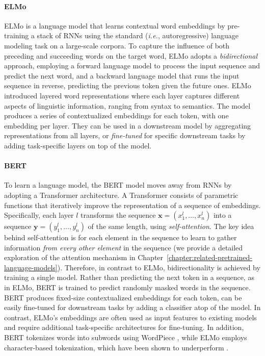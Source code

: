 \paragraph{ELMo} \ac{ELMo} \citep{peters-etal-2018-deep} is a language model that learns contextual word embeddings by pre-training a stack of \acp{RNN} using the standard (\textit{i.e.}, autoregressive) language modeling task on a large-scale corpora. To capture the influence of both preceding and succeeding words on the target word, \ac{ELMo} adopts a \textit{bidirectional} approach, employing a forward language model to process the input sequence and predict the next word, and a backward language model that runs the input sequence in reverse, predicting the previous token given the future ones. \ac{ELMo} introduced layered word representations where each layer captures different aspects of linguistic information, ranging from syntax to semantics. The model produces a series of contextualized embeddings for each token, with one embedding per layer. They can be used in a downstream model by aggregating representations from all layers, or \textit{fine-tuned} for specific downstream tasks by adding task-specific layers on top of the model.

\paragraph{BERT} To learn a language model, the \ac{BERT} model \citep{devlin2018bert} moves away from \acp{RNN} by adopting a Transformer \citep{vaswani2017attention} architecture. A Transformer consists of parametric functions that iteratively improve the representation of a sequence of embeddings. Specifically, each layer $l$ transforms the sequence $\bm{x} = (x^l_1, \ldots, x^l_n)$ into a sequence $\bm{y} = (y^l_1, \ldots, y^l_n)$ of the same length, using \textit{self-attention}. The key idea behind self-attention is for each element in the sequence to learn to gather information \textit{from every other element} in the sequence (we provide a detailed exploration of the attention mechanism in Chapter~\ref{chapter:related-pretrained-language-models}). Therefore, in contrast to \ac{ELMo}, bidirectionality is achieved by training a single model. Rather than predicting the next token in a sequence, as in \ac{ELMo}, \ac{BERT} is trained to predict randomly masked words in the sequence. \ac{BERT} produces fixed-size contextualized embeddings for each token, can be easily fine-tuned for downstream tasks by adding a classifier atop of the model. In contrast, \ac{ELMo}'s embeddings are often used as input features to existing models and require additional task-specific architectures for fine-tuning. In addition, \ac{BERT} tokenizes words into subwords using WordPiece \citep{wu2016google}, while \ac{ELMo} employs character-based tokenization, which have been shown to underperform \citep{al2019character}. 


